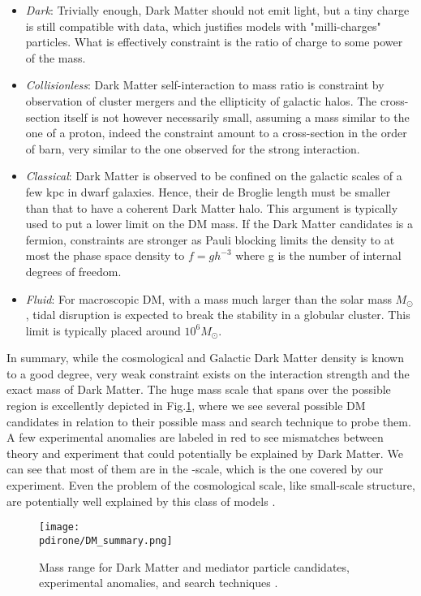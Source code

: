 \begin{itemize}
\item \textit{Dark}: Trivially enough, Dark Matter should not emit light, but a tiny charge is still compatible with data, which justifies models with "milli-charges" particles. What is effectively constraint is the ratio of charge to some power of the mass.
\item \textit{Collisionless}: Dark Matter self-interaction to mass ratio is constraint by observation of cluster mergers and the ellipticity of galactic halos. The cross-section itself is not however necessarily small, assuming a mass similar to the one of a proton, indeed the constraint amount to a cross-section in the order of barn, very similar to the one observed for the strong interaction.
\item \textit{Classical}: Dark Matter is observed to be confined on the galactic scales of a few kpc in dwarf galaxies. Hence, their de Broglie length must be smaller than that to have a coherent Dark Matter halo. This argument is typically used to put a lower limit on the DM mass. If the Dark Matter candidates is a fermion, constraints are stronger as Pauli blocking limits the density to at most the phase space density to $f=gh^{-3}$ where g is the number of internal degrees of freedom.
\item \textit{Fluid}: For macroscopic DM, with a mass much larger than the solar mass $M_{\odot}$, tidal disruption is expected to break the stability in a globular cluster. This limit is typically placed around $10^6 M_{\odot}$.
\end{itemize}

In summary, while the cosmological and Galactic Dark Matter density is known to a good degree, very weak constraint exists on the interaction strength and the exact mass of Dark Matter. The huge mass scale that spans over the possible region is excellently depicted in Fig.\ref{fig:dm-mass-range}, where we see several possible DM candidates in relation to their possible mass and search technique to probe them. A few experimental anomalies are labeled in red to see mismatches between theory and experiment that could potentially be explained by Dark Matter. We can see that most of them are in the \mev-\gev scale, which is the one covered by our experiment. Even the problem of the cosmological scale, like small-scale structure, are potentially well explained by this class of models \cite{battaglieri2017cosmic}.

\begin{figure}[bht!]
  \centering
  \texttt{[image: \\pdirone/DM\_summary.png]}
  \caption[Mass range for Dark Matter]{Mass range for Dark Matter and mediator particle candidates, experimental anomalies, and search techniques \cite{battaglieri2017cosmic}.}
  \label{fig:dm-mass-range}
\end{figure}

